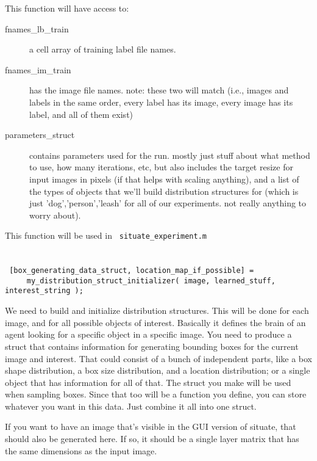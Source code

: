 \documentclass[11pt]{article}
\begin{document}
This function will have access to:
	\begin{description}
		\item[fnames\_lb\_train]
			a cell array of training label file names. 
		\item[fnames\_im\_train]
			has the image file names.
			note: these two will match (i.e., images and labels in the same order, every label has its image, every image has its label, and all of them exist)
	\item[parameters\_struct]
			contains parameters used for the run. mostly just stuff about what method to use, how many iterations, etc, but also includes the target resize for input images in pixels (if that helps with scaling anything), and a list of the types of objects that we'll build distribution structures for (which is just {'dog','person','leash'} for all of our experiments. not really anything to worry about).
	\end{description}

	This function will be used in \verb| situate_experiment.m |




\section{}

\verb| [box_generating_data_struct, location_map_if_possible] = | \\
\verb|     my_distribution_struct_initializer( image, learned_stuff, interest_string ); |
	
	We need to build and initialize distribution structures. This will be done for each image, and for all possible objects of interest. Basically it defines the brain of an agent looking for a specific object in a specific image. You need to produce a struct that contains information for generating bounding boxes for the current image and interest. That could consist of a bunch of independent parts, like a box shape distribution, a box size distribution, and a location distribution; or a single object that has information for all of that. The struct you make will be used when sampling boxes. Since that too will be a function you define, you can store whatever you want in this data. Just combine it all into one struct.

	If you want to have an image that's visible in the GUI version of situate, that should also be generated here. If so, it should be a single layer matrix that has the same dimensions as the input image.
\end{document}
